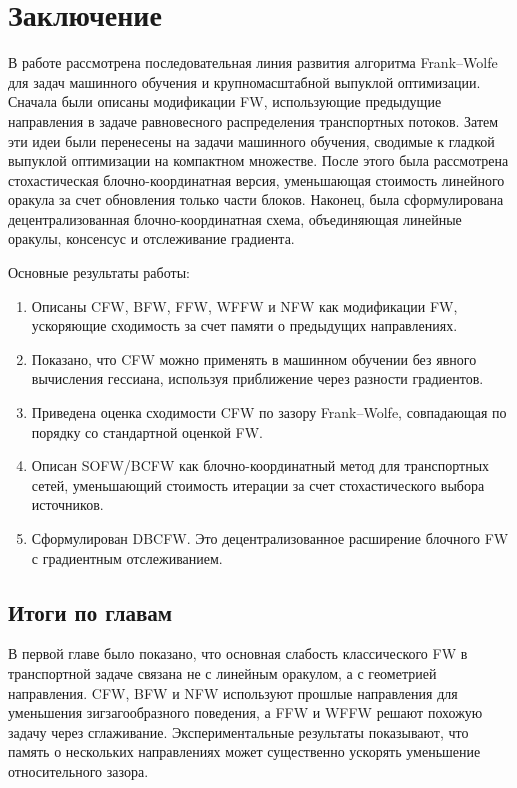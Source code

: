 \newpage

\section{Заключение}

В работе рассмотрена последовательная линия развития алгоритма Frank--Wolfe для задач машинного обучения и крупномасштабной выпуклой оптимизации.
Сначала были описаны модификации FW, использующие предыдущие направления в задаче равновесного распределения транспортных потоков.
Затем эти идеи были перенесены на задачи машинного обучения, сводимые к гладкой выпуклой оптимизации на компактном множестве.
После этого была рассмотрена стохастическая блочно-координатная версия, уменьшающая стоимость линейного оракула за счет обновления только части блоков.
Наконец, была сформулирована децентрализованная блочно-координатная схема, объединяющая линейные оракулы, консенсус и отслеживание градиента.

Основные результаты работы:
\begin{enumerate}
    \item Описаны CFW, BFW, FFW, WFFW и NFW как модификации FW, ускоряющие сходимость за счет памяти о предыдущих направлениях.
    \item Показано, что CFW можно применять в машинном обучении без явного вычисления гессиана, используя приближение через разности градиентов.
    \item Приведена оценка сходимости CFW по зазору Frank--Wolfe, совпадающая по порядку со стандартной оценкой FW.
    \item Описан SOFW/BCFW как блочно-координатный метод для транспортных сетей, уменьшающий стоимость итерации за счет стохастического выбора источников.
    \item Сформулирован DBCFW.
    Это децентрализованное расширение блочного FW с градиентным отслеживанием.
\end{enumerate}

\subsection{Итоги по главам}

В первой главе было показано, что основная слабость классического FW в транспортной
задаче связана не с линейным оракулом, а с геометрией направления.
CFW, BFW и NFW используют прошлые направления для уменьшения зигзагообразного поведения,
а FFW и WFFW решают похожую задачу через сглаживание.
Экспериментальные результаты показывают, что память о нескольких направлениях
может существенно ускорять уменьшение относительного зазора.

